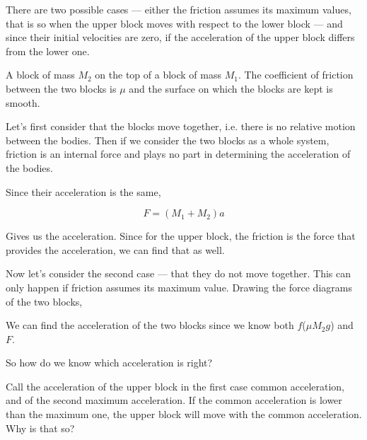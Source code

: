 There are two possible cases --- either the friction assumes its maximum values, that is so when
the upper block moves with respect to the lower block --- and since their initial velocities
are zero, if the acceleration of the upper block differs from the lower one.

\begin{marginfigure}
    \caption{A block of mass \(M_2\) on the top of a block of mass \(M_1\).
    The coefficient of friction between the two blocks is \(\mu\) and the surface on which
    the blocks are kept is smooth.}
    \label{fig: friction with blocks1}
\end{marginfigure}

Let's first consider that the blocks move together, i.e. there is no relative motion 
between the bodies. Then if we consider the two blocks as a whole system,
friction is an internal force and plays no part in determining the acceleration of the bodies.

Since their acceleration is the same, 

\begin{equation*}
    F = (M_1 + M_2)a
\end{equation*}

Gives us the acceleration. Since for the upper block, the friction is the force 
that provides the acceleration, we can find that as well.

\begin{marginfigure}
\end{marginfigure}

Now let's consider the second case --- that they do not move together. This can only happen 
if friction assumes its maximum value. Drawing the force diagrams of the two blocks,

We can find the acceleration of the two blocks since we know both \(f\)(\(\mu M_2g\)) 
and \(F\).

So how do we know which acceleration is right?

\begin{marginfigure}
\end{marginfigure}

Call the acceleration of the upper block in the first case common acceleration, and of the second maximum acceleration.
If the common acceleration is lower than the maximum one, the upper block will move 
with the common acceleration. Why is that so?

